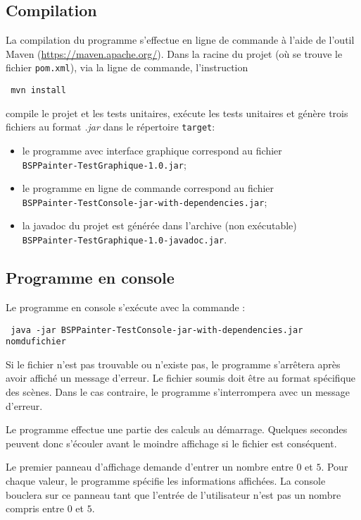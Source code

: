 \subsection{Compilation}
La compilation du programme s'effectue en ligne de commande à l'aide
de l'outil Maven (\url{https://maven.apache.org/}). Dans la racine
du projet (où se trouve le fichier \texttt{pom.xml}),
via la ligne de commande, l'instruction
\begin{center}
  \texttt{
    mvn install
  }
\end{center}
compile le projet et les tests unitaires, exécute les tests unitaires
et génère trois fichiers au format \emph{.jar} dans le répertoire
\texttt{target}:
\begin{itemize}
\item le programme avec interface graphique correspond au fichier
  \\ \texttt{BSPPainter-TestGraphique-1.0.jar};
\item le programme en ligne de commande correspond au fichier
  \\ \texttt{BSPPainter-TestConsole-jar-with-dependencies.jar};
\item la javadoc du projet est générée dans l'archive (non exécutable)
  \\ \texttt{BSPPainter-TestGraphique-1.0-javadoc.jar}.
\end{itemize}

\subsection{Programme en console}
Le programme en console s'exécute avec la commande :
\begin{center}
  \texttt{
    java -jar BSPPainter-TestConsole-jar-with-dependencies.jar nomdufichier
  }
\end{center}

Si le fichier n'est pas trouvable ou n'existe pas, le programme
s'arrêtera après avoir affiché un message d'erreur.
Le fichier soumis doit être au format spécifique des scènes.
Dans le cas contraire, le programme s'interrompera avec un message
d'erreur.

Le programme effectue une partie des calculs au démarrage.
Quelques secondes peuvent donc s'écouler avant le moindre affichage
si le fichier est conséquent.

Le premier panneau d'affichage demande d'entrer un
nombre entre $0$ et $5$. Pour chaque valeur, le programme
spécifie les informations affichées.
La console bouclera sur ce panneau tant que
l'entrée de l'utilisateur n'est pas un nombre
compris entre $0$ et $5$.

